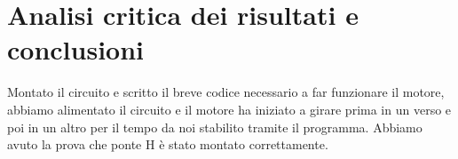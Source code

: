 \documentclass[12pt]{article}
\begin{document}
\section{Analisi critica dei risultati e conclusioni}
Montato il circuito e scritto il breve codice necessario a far funzionare il motore, abbiamo alimentato il circuito
e il motore ha iniziato a girare prima in un verso e poi in un altro per il tempo da noi stabilito tramite il 
programma.
Abbiamo avuto la prova che ponte H è stato montato correttamente.\\
\end{document}
